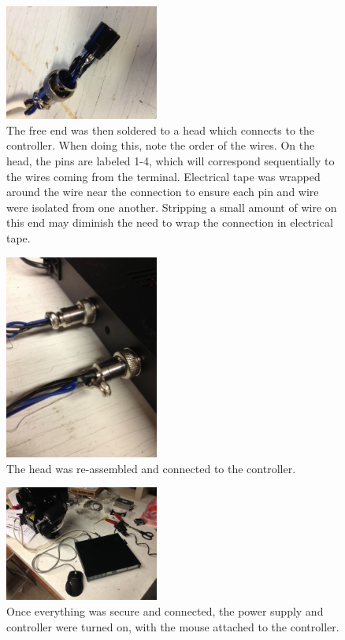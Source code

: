\documentclass[11pt]{article} %
\begin{document}
\begin{figure}
  \centering
  \caption{The free end was then soldered to a head which connects to the controller. When doing this, note the order of the wires. On the head, the pins are labeled 1-4, which will correspond sequentially to the wires coming from the terminal. Electrical tape was wrapped around the wire near the connection to ensure each pin and wire were isolated from one another. Stripping a small amount of wire on this end may diminish the need to wrap the connection in electrical tape.}
  \includegraphics[width=0.45\textwidth]{wiring/08.jpeg}
\end{figure}


\begin{figure}
  \centering
  \caption{The head was re-assembled and connected to the controller.}
  \includegraphics[width=0.45\textwidth]{wiring/09.jpeg}
\end{figure}


\begin{figure}
  \centering
  \caption{Once everything was secure and connected, the power supply and controller were turned on, with the mouse attached to the controller. }
  \includegraphics[width=0.45\textwidth]{wiring/10.jpeg}
\end{figure}
\end{document}
